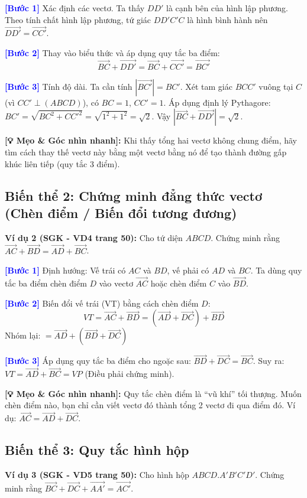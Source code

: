 \documentclass[12pt,a4paper]{article}
\begin{document}
\noindent\textbf{\textcolor{blue}{[Bước 1]}} Xác định các vectơ. Ta thấy $DD'$ là cạnh bên của hình lập phương. Theo tính chất hình lập phương, tứ giác $DD'C'C$ là hình bình hành nên $\vec{DD'} = \vec{CC'}$.

\noindent\textbf{\textcolor{blue}{[Bước 2]}} Thay vào biểu thức và áp dụng quy tắc ba điểm:
\[
\vec{BC} + \vec{DD'} = \vec{BC} + \vec{CC'} = \vec{BC'}
\]

\noindent\textbf{\textcolor{blue}{[Bước 3]}} Tính độ dài. Ta cần tính $|\vec{BC'}| = BC'$.
Xét tam giác $BCC'$ vuông tại $C$ (vì $CC' \perp (ABCD)$), có $BC = 1$, $CC' = 1$.
Áp dụng định lý Pythagore: $BC' = \sqrt{BC^2 + CC'^2} = \sqrt{1^2 + 1^2} = \sqrt{2}$.
Vậy $|\vec{BC} + \vec{DD'}| = \sqrt{2}$.

\noindent\textbf{[💡 Mẹo \& Góc nhìn nhanh]:} Khi thấy tổng hai vectơ không chung điểm, hãy tìm cách thay thế vectơ này bằng một vectơ bằng nó để tạo thành đường gấp khúc liên tiếp (quy tắc 3 điểm).

\vspace{0.5cm}

\subsection*{Biến thể 2: Chứng minh đẳng thức vectơ (Chèn điểm / Biến đổi tương đương)}
\textbf{Ví dụ 2 (SGK - VD4 trang 50):} Cho tứ diện $ABCD$. Chứng minh rằng $\vec{AC} + \vec{BD} = \vec{AD} + \vec{BC}$.

\noindent\textbf{\textcolor{blue}{[Bước 1]}} Định hướng: Vế trái có $AC$ và $BD$, vế phải có $AD$ và $BC$. Ta dùng quy tắc ba điểm chèn điểm $D$ vào vectơ $\vec{AC}$ hoặc chèn điểm $C$ vào $\vec{BD}$.

\noindent\textbf{\textcolor{blue}{[Bước 2]}} Biến đổi vế trái (VT) bằng cách chèn điểm $D$:
\[
VT = \vec{AC} + \vec{BD} = (\vec{AD} + \vec{DC}) + \vec{BD}
\]
Nhóm lại: $= \vec{AD} + (\vec{BD} + \vec{DC})$

\noindent\textbf{\textcolor{blue}{[Bước 3]}} Áp dụng quy tắc ba điểm cho ngoặc sau: $\vec{BD} + \vec{DC} = \vec{BC}$.
Suy ra: $VT = \vec{AD} + \vec{BC} = VP$ (Điều phải chứng minh).

\noindent\textbf{[💡 Mẹo \& Góc nhìn nhanh]:} Quy tắc chèn điểm là ``vũ khí'' tối thượng. Muốn chèn điểm nào, bạn chỉ cần viết vectơ đó thành tổng 2 vectơ đi qua điểm đó. Ví dụ: $\vec{AC} = \vec{AD} + \vec{DC}$.

\vspace{0.5cm}

\subsection*{Biến thể 3: Quy tắc hình hộp}
\textbf{Ví dụ 3 (SGK - VD5 trang 50):} Cho hình hộp $ABCD.A'B'C'D'$. Chứng minh rằng $\vec{BC} + \vec{DC} + \vec{AA'} = \vec{AC'}$.
\end{document}
